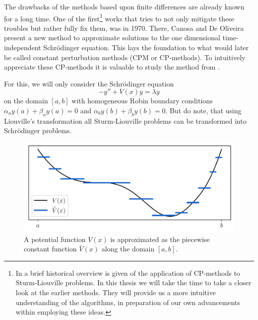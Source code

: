 The drawbacks of the methods based upon finite differences are already known for a long time. One of the first\footnote{In \cite{ledoux_solving_2010} a brief historical overview is given of the application of CP-methods to Sturm-Liouville problems. In this thesis we will take the time to take a closer look at the earlier methods. They will provide us a more intuitive understanding of the algorithms, in preparation of our own advancements within employing these ideas.} works that tries to not only mitigate these troubles but rather fully fix them, was \cite{canosa_new_1970} in 1970. There, Canosa and De Oliveira present a new method to approximate solutions to the one dimensional time-independent Schrödinger equation. This lays the foundation to what would later be called constant perturbation methods (CPM or CP-methods). To intuitively appreciate these CP-methods it is valuable to study the method from \cite{canosa_new_1970}.

For this, we will only consider the Schrödinger equation
\begin{equation}\label{equ:c2_cpm_schrodinger}
    - y'' + V(x) y = \lambda y
\end{equation}
on the domain $[a, b]$ with homogeneous Robin boundary conditions $\alpha_a y(a) + \beta_a y(a) = 0$ and $\alpha_b y(b) + \beta_b y(b) = 0$. But do note, that using Liouville's transformation all Sturm-Liouville problems can be transformed into Schrödinger problems.

\begin{figure}
    \begin{center}
        \includegraphics[width=\textwidth]{img/chapter2/cpm_constant_approx.pdf}
        \caption{A potential function $V(x)$ is approximated as the piecewise constant function $\bar{V}(x)$ along the domain $[a, b]$.}
        \label{fig:c2_cpm_constant_approx}
    \end{center}
\end{figure}

